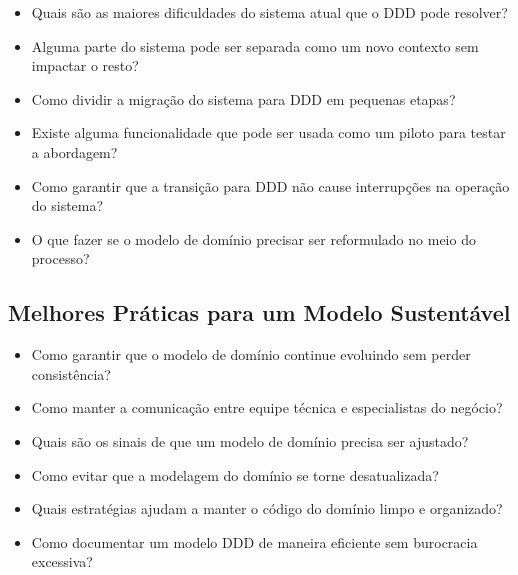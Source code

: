\begin{itemize}
    \item Quais são as maiores dificuldades do sistema atual que o DDD pode resolver?
    \item Alguma parte do sistema pode ser separada como um novo contexto sem impactar o resto?
    \item Como dividir a migração do sistema para DDD em pequenas etapas?
    \item Existe alguma funcionalidade que pode ser usada como um piloto para testar a abordagem?
    \item Como garantir que a transição para DDD não cause interrupções na operação do sistema?
    \item O que fazer se o modelo de domínio precisar ser reformulado no meio do processo?
\end{itemize}

\subsection{Melhores Práticas para um Modelo Sustentável}

\begin{itemize}
    \item Como garantir que o modelo de domínio continue evoluindo sem perder consistência?
    \item Como manter a comunicação entre equipe técnica e especialistas do negócio?
    \item Quais são os sinais de que um modelo de domínio precisa ser ajustado?
    \item Como evitar que a modelagem do domínio se torne desatualizada?
    \item Quais estratégias ajudam a manter o código do domínio limpo e organizado?
    \item Como documentar um modelo DDD de maneira eficiente sem burocracia excessiva?
\end{itemize}

